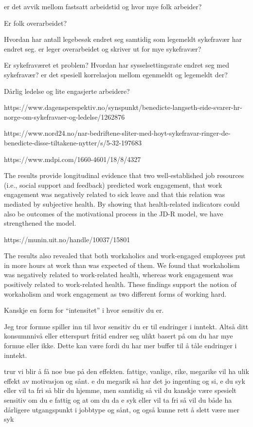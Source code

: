 \documentclass[
  12pt,
  a4paper,
  DIV=11,
  numbers=noendperiod]{scrartcl}
\begin{document}
er det avvik mellom fastsatt arbeidstid og hvor mye folk arbeider?

Er folk overarbeidet?

Hvordan har antall legebesøk endret seg samtidig som legemeldt
sykefravær har endret seg. er leger overarbeidet og skriver ut for mye
sykefravær?

Er sykefraværet et problem? Hvordan har sysselsettingsrate endret seg
med sykefravær? er det spesiell korrelasjon mellom egenmeldt og
legemeldt der?

Dårlig ledelse og lite engasjerte arbeidere?

https://www.dagensperspektiv.no/synspunkt/benedicte-langseth-eide-svarer-hr-norge-om-sykefravaer-og-ledelse/1262876

https://www.nord24.no/nar-bedriftene-sliter-med-hoyt-sykefravar-ringer-de-benedicte-disse-tiltakene-nytter/s/5-32-197683

https://www.mdpi.com/1660-4601/18/8/4327

The results provide longitudinal evidence that two well-established job
resources (i.e., social support and feedback) predicted work engagement,
that work engagement was negatively related to sick leave and that this
relation was mediated by subjective health. By showing that
health-related indicators could also be outcomes of the motivational
process in the JD-R model, we have strengthened the model.

https://munin.uit.no/handle/10037/15801

The results also revealed that both workaholics and work-engaged
employees put in more hours at work than was expected of them. We found
that workaholism was negatively related to work-related health, whereas
work engagement was positively related to work-related health. These
findings support the notion of workaholism and work engagement as two
different forms of working hard.

Kanskje en form for ``intensitet'' i hvor sensitiv du er.

Jeg tror formue spiller inn til hvor sensitiv du er til endringer i
inntekt. Altså ditt konsumnnivå eller etterspurt fritid endrer seg ulikt
basert på om du har mye formue eller ikke. Dette kan være fordi du har
mer buffer til å tåle endringer i inntekt.

trur vi blir å få noe bue på den effekten. fattige, vanlige, rike,
megarike vil ha ulik effekt av motivasjon og sånt. e du megarik så har
det jo ingenting og si, e du syk eller vil ta fri så blir du hjemme, men
samtidig så vil du kanskje være spesielt sensitiv om du e fattig og at
om du da e syk eller vil ta fri så vil du både ha dårligere utgangspunkt
i jobbtype og sånt, og også kunne rett å slett være mer syk
\end{document}
